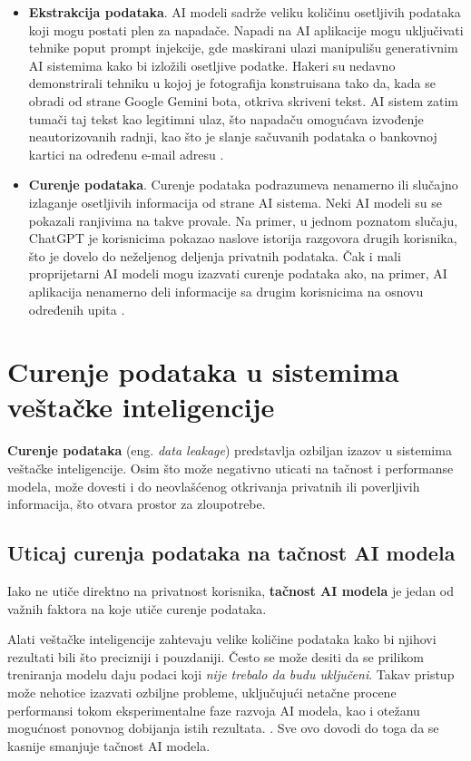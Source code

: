 \documentclass[a4paper,12pt]{article}
\begin{document}
\begin{itemize}
    \item \textbf{Ekstrakcija podataka}.
    AI modeli sadrže veliku količinu osetljivih podataka koji mogu postati plen za napadače. Napadi na AI aplikacije mogu uključivati tehnike poput prompt injekcije, gde maskirani ulazi manipulišu generativnim AI sistemima kako bi izložili osetljive podatke. Hakeri su nedavno demonstrirali tehniku u kojoj je fotografija konstruisana tako da, kada se obradi od strane Google Gemini bota, otkriva skriveni tekst. AI sistem zatim tumači taj tekst kao legitimni ulaz, što napadaču omogućava izvođenje neautorizovanih radnji, kao što je slanje sačuvanih podataka o bankovnoj kartici na određenu e-mail adresu \cite{Chandekar2025}.  

    \item \textbf{Curenje podataka}. 
    Curenje podataka podrazumeva nenamerno ili slučajno izlaganje osetljivih informacija od strane AI sistema. Neki AI modeli su se pokazali ranjivima na takve provale. Na primer, u jednom poznatom slučaju, ChatGPT je korisnicima pokazao naslove istorija razgovora drugih korisnika, što je dovelo do neželjenog deljenja privatnih podataka. Čak i mali proprijetarni AI modeli mogu izazvati curenje podataka ako, na primer, AI aplikacija nenamerno deli informacije sa drugim korisnicima na osnovu određenih upita \cite{ibm_ai_privacy}.  
\end{itemize}


\section{Curenje podataka u sistemima veštačke inteligencije}

\textbf{Curenje podataka} (eng. \textit{data leakage}) predstavlja ozbiljan izazov u sistemima veštačke inteligencije. Osim što može negativno uticati na tačnost i performanse modela, može dovesti i do neovlašćenog otkrivanja privatnih ili poverljivih informacija, što otvara prostor za zloupotrebe.

\subsection{Uticaj curenja podataka na tačnost AI modela}

Iako ne utiče direktno na privatnost korisnika, \textbf{tačnost AI modela} je jedan od važnih faktora na koje utiče curenje podataka.

Alati veštačke inteligencije zahtevaju velike količine podataka kako bi njihovi rezultati bili što precizniji i pouzdaniji. Često se može desiti da se prilikom treniranja modelu daju podaci koji \textit{nije trebalo da budu uključeni}. Takav pristup može nehotice izazvati ozbiljne probleme, uključujući netačne procene performansi tokom eksperimentalne faze razvoja AI modela, kao i otežanu mogućnost ponovnog dobijanja istih rezultata. \cite{apicella2024dontpushbuttonexploring}.  Sve ovo dovodi do toga da se kasnije smanjuje tačnost AI modela.
\end{document}
